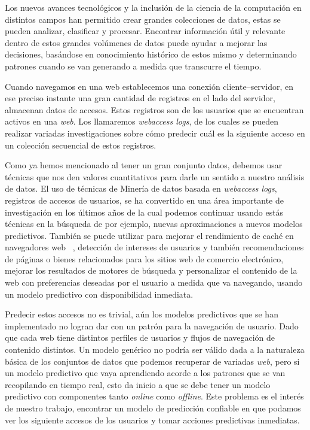 {
Los nuevos avances tecnológicos y la inclusión de la ciencia de la computación en distintos campos han permitido crear grandes colecciones de datos, estas se pueden analizar, clasificar y procesar. Encontrar información útil y relevante dentro de estos grandes volúmenes de datos puede ayudar a mejorar las decisiones, basándose en conocimiento histórico de estos mismo y determinando patrones cuando se van generando a medida que transcurre el tiempo. 


Cuando navegamos en una web establecemos una conexión {cliente--servidor}, en ese preciso instante una gran cantidad de registros en el lado del servidor, almacenan datos de accesos. Estos registros son de los usuarios que se encuentran activos en una \emph{web}. Los llamaremos \emph{webaccess logs}, de los cuales se pueden realizar variadas investigaciones sobre cómo predecir cuál es la siguiente acceso en un colección secuencial de estos registros. 

Como ya hemos mencionado  al tener un gran conjunto datos, debemos usar técnicas que nos den valores cuantitativos para darle un sentido a nuestro análisis de datos. El uso de técnicas de Minería de datos basada en \emph{webaccess logs}, registros de accesos de usuarios, se ha convertido en una área importante de investigación en los últimos años de la cual podemos continuar usando estás técnicas en la búsqueda de por ejemplo,  nuevas aproximaciones a nuevos modelos predictivos. También se puede utilizar para mejorar el rendimiento de caché en navegadores web \etal~\cite{Moghaddam2009},  detección de intereses de usuarios y también recomendaciones de páginas o bienes relacionados para los sitios web de comercio electrónico, mejorar los resultados de motores de búsqueda y personalizar el contenido de la web con preferencias deseadas por el usuario a medida que va navegando, usando un modelo predictivo con disponibilidad inmediata.

Predecir estos  accesos no es trivial, aún los modelos predictivos que se han implementado no logran dar con un patrón para la navegación de usuario. Dado que cada web tiene distintos perfiles de usuarios y flujos de navegación de contenido distintos. Un modelo genérico no podría ser válido dada a la naturaleza básica de los conjuntos de datos que podemos recuperar de variadas \emph{web}, pero si un modelo predictivo que vaya aprendiendo acorde a los patrones que se van recopilando en tiempo real, esto da inicio a que se debe tener un modelo predictivo con componentes tanto \emph{online} como \emph{offline}. Este problema es el interés de nuestro trabajo, encontrar un modelo de predicción confiable en que podamos ver los siguiente accesos de los usuarios y tomar acciones predictivas inmediatas. 

}
